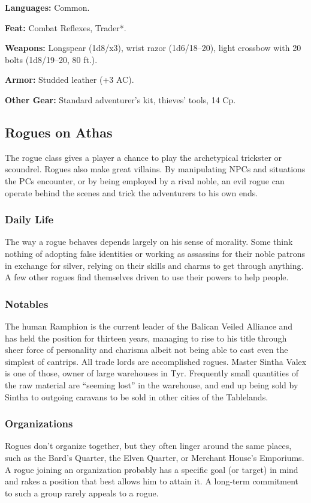 \textbf{Languages:} Common.

\textbf{Feat:} Combat Reflexes, Trader*.

\textbf{Weapons:} Longspear (1d8/x3), wrist razor (1d6/18–20), light crossbow with 20 bolts (1d8/19–20, 80 ft.).

\textbf{Armor:} Studded leather (+3 AC).

\textbf{Other Gear:} Standard adventurer’s kit, thieves’ tools, 14 Cp.

\subsection{Rogues on Athas}

The rogue class gives a player a chance to play the archetypical trickster or scoundrel. Rogues also make great villains. By manipulating NPCs and situations the PCs encounter, or by being employed by a rival noble, an evil rogue can operate behind the scenes and trick the adventurers to his own ends.

\subsubsection{Daily Life}
The way a rogue behaves depends largely on his sense of morality. Some think nothing of adopting false identities or working as assassins for their noble patrons in exchange for silver, relying on their skills and charms to get through anything. A few other rogues find themselves driven to use their powers to help people.

\subsubsection{Notables}
The human Ramphion is the current leader of the Balican Veiled Alliance and has held the position for thirteen years, managing to rise to his title through sheer force of personality and charisma albeit not being able to cast even the simplest of cantrips. All trade lords are accomplished rogues. Master Sintha Valex is one of those, owner of large warehouses in Tyr. Frequently small quantities of the raw material are “seeming lost” in the warehouse, and end up being sold by Sintha to outgoing caravans to be sold in other cities of the Tablelands.

\subsubsection{Organizations}
Rogues don’t organize together, but they often linger around the same places, such as the Bard’s Quarter, the Elven Quarter, or Merchant House’s Emporiums. A rogue joining an organization probably has a specific goal (or target) in mind and rakes a position that best allows him to attain it. A long‐term commitment to such a group rarely appeals to a rogue.

